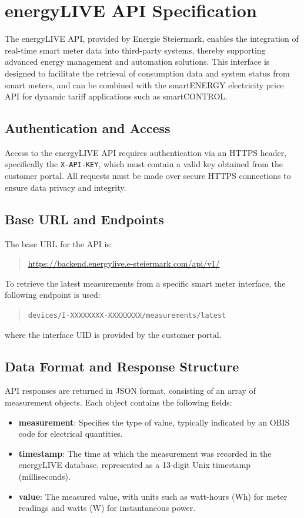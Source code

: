 \newpage
\section{energyLIVE API Specification}
\label{appendix:energylive-api}

The energyLIVE API, provided by Energie Steiermark, enables the integration of real-time smart meter data into third-party systems, thereby supporting advanced energy management and automation solutions. This interface is designed to facilitate the retrieval of consumption data and system status from smart meters, and can be combined with the smartENERGY electricity price API for dynamic tariff applications such as smartCONTROL.

\subsection{Authentication and Access}

Access to the energyLIVE API requires authentication via an HTTPS header, specifically the \texttt{X-API-KEY}, which must contain a valid key obtained from the customer portal. All requests must be made over secure HTTPS connections to ensure data privacy and integrity.

\subsection{Base URL and Endpoints}
The base URL for the API is:
\begin{quote}
    \url{https://backend.energylive.e-steiermark.com/api/v1/}
\end{quote}
To retrieve the latest measurements from a specific smart meter interface, the following endpoint is used:
\begin{quote}
    \texttt{devices/I-XXXXXXXX-XXXXXXXX/measurements/latest}
\end{quote}
where the interface UID is provided by the customer portal.

\subsection{Data Format and Response Structure}
API responses are returned in JSON format, consisting of an array of measurement objects. Each object contains the following fields:
\begin{itemize}
    \item \textbf{measurement}: Specifies the type of value, typically indicated by an OBIS code for electrical quantities.
    \item \textbf{timestamp}: The time at which the measurement was recorded in the energyLIVE database, represented as a 13-digit Unix timestamp (milliseconds).
    \item \textbf{value}: The measured value, with units such as watt-hours (Wh) for meter readings and watts (W) for instantaneous power.
\end{itemize}

